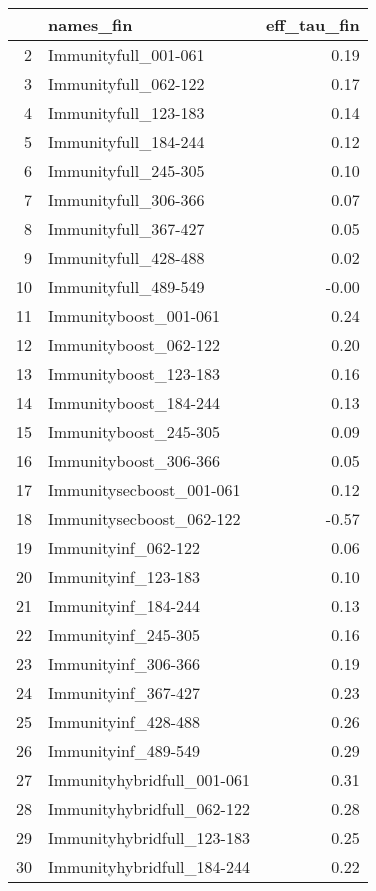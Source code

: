 \begin{table}[ht]
\centering
\begin{tabular}{rlr}
  \hline
 & names\_fin & eff\_tau\_fin \\ 
  \hline
2 & Immunityfull\_001-061 & 0.19 \\ 
  3 & Immunityfull\_062-122 & 0.17 \\ 
  4 & Immunityfull\_123-183 & 0.14 \\ 
  5 & Immunityfull\_184-244 & 0.12 \\ 
  6 & Immunityfull\_245-305 & 0.10 \\ 
  7 & Immunityfull\_306-366 & 0.07 \\ 
  8 & Immunityfull\_367-427 & 0.05 \\ 
  9 & Immunityfull\_428-488 & 0.02 \\ 
  10 & Immunityfull\_489-549 & -0.00 \\ 
  11 & Immunityboost\_001-061 & 0.24 \\ 
  12 & Immunityboost\_062-122 & 0.20 \\ 
  13 & Immunityboost\_123-183 & 0.16 \\ 
  14 & Immunityboost\_184-244 & 0.13 \\ 
  15 & Immunityboost\_245-305 & 0.09 \\ 
  16 & Immunityboost\_306-366 & 0.05 \\ 
  17 & Immunitysecboost\_001-061 & 0.12 \\ 
  18 & Immunitysecboost\_062-122 & -0.57 \\ 
  19 & Immunityinf\_062-122 & 0.06 \\ 
  20 & Immunityinf\_123-183 & 0.10 \\ 
  21 & Immunityinf\_184-244 & 0.13 \\ 
  22 & Immunityinf\_245-305 & 0.16 \\ 
  23 & Immunityinf\_306-366 & 0.19 \\ 
  24 & Immunityinf\_367-427 & 0.23 \\ 
  25 & Immunityinf\_428-488 & 0.26 \\ 
  26 & Immunityinf\_489-549 & 0.29 \\ 
  27 & Immunityhybridfull\_001-061 & 0.31 \\ 
  28 & Immunityhybridfull\_062-122 & 0.28 \\ 
  29 & Immunityhybridfull\_123-183 & 0.25 \\ 
  30 & Immunityhybridfull\_184-244 & 0.22 \\ 

\end{tabular}
\end{table}

